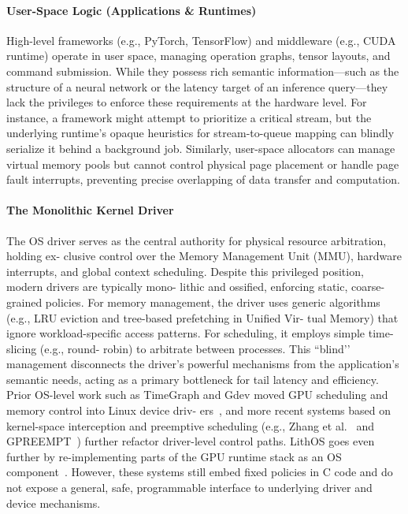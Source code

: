 \paragraph{User-Space Logic (Applications \& Runtimes)}
High-level frameworks (e.g., PyTorch, TensorFlow) and middleware (e.g., CUDA runtime) operate in user space, managing operation graphs, tensor layouts, and command submission. While they possess rich semantic information---such as the structure of a neural network or the latency target of an inference query---they lack the privileges to enforce these requirements at the hardware level. For instance, a framework might attempt to prioritize a critical stream, but the underlying runtime's opaque heuristics for stream-to-queue mapping can blindly serialize it behind a background job. Similarly, user-space allocators can manage virtual memory pools but cannot control physical page placement or handle page fault interrupts, preventing precise overlapping of data transfer and computation.

\paragraph{The Monolithic Kernel Driver}
The OS driver serves as the
central authority for physical resource arbitration, holding ex-
clusive control over the Memory Management Unit (MMU),
hardware interrupts, and global context scheduling. Despite
this privileged position, modern drivers are typically mono-
lithic and ossified, enforcing static, coarse-grained policies.
For memory management, the driver uses generic algorithms
(e.g., LRU eviction and tree-based prefetching in Unified Vir-
tual Memory) that ignore workload-specific access patterns.
For scheduling, it employs simple time-slicing (e.g., round-
robin) to arbitrate between processes. This “blind’’ management disconnects the driver’s powerful mechanisms from the application’s semantic needs, acting as a primary bottleneck for tail latency and efficiency. Prior OS-level work such as TimeGraph and Gdev moved
GPU scheduling and memory control into Linux device driv-
ers~\cite{timegraph,gdev}, and more recent systems based on
kernel-space interception and preemptive scheduling (e.g.,
Zhang et al.~\cite{kernelintercept} and GPREEMPT~\cite{gpreempt})
further refactor driver-level control paths. LithOS goes even
further by re-implementing parts of the GPU runtime stack as
an OS component~\cite{lithos}. However, these systems still
embed fixed policies in C code and do not expose a general,
safe, programmable interface to underlying driver and device
mechanisms.


